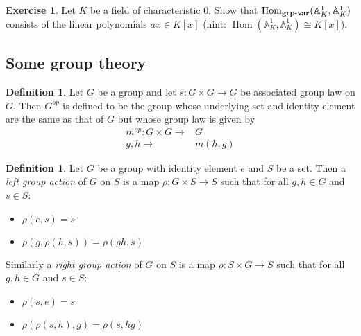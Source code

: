 \documentclass[a4paper,12pt,reqno]{amsart}
\newcommand{\field}[1]{\mathbb{#1}}  %
\newcommand{\A}{\field{A}}
\newcommand{\HomGrpVar}{\mathrm{Hom}_{\bf grp\text{-}var}}
\DeclareMathOperator{\Hom}{Hom}
\theoremstyle{definition}
\newtheorem{definition}[lemma]{Definition}
\newtheorem{exercise}[lemma]{Exercise}
\numberwithin{lemma}{section}
\numberwithin{equation}{section}
\numberwithin{figure}{section}
\begin{document}
\begin{exercise}
Let $K$ be a field of characteristic $0$. Show that $\HomGrpVar(\A^1_K, \A^1_K)$ consists of the linear polynomials $ax \in K[x]$ (hint: $\Hom(\A^1_K, \A^1_K) \cong K[x]$). 
\end{exercise}



\subsection{Some group theory}

\begin{definition}Let $G$ be a group and let $s: G \times G \to G$ be associated group law on $G$. Then $G^{op}$ is defined to be the group whose underlying set and identity element are the same as that of $G$ but whose group law is given by \begin{align*}
	m^{op}: G \times G \to& G \\
	  g,h \mapsto& m(h,g)
	\end{align*}
\end{definition}

\begin{definition}\label{def:group_action}
	Let $G$ be a group with identity element $e$ and $S$ be a set. Then a \textit{left group action} of $G$ on $S$ is a map $\rho: G \times S \to S$  such that for all $g,h \in G$ and $s \in S$:
	\begin{itemize}
		\item $\rho(e, s) = s$
		\item $\rho(g,\rho(h,s))=\rho(gh,s)$
	\end{itemize}
Similarly a \textit{right group action} of $G$ on $S$ is a map $\rho: S \times G \to S$  such that for all $g,h \in G$ and $s \in S$:
\begin{itemize}
	\item $\rho(s,e) = s$
	\item $\rho(\rho(s,h),g)=\rho(s,hg)$
\end{itemize}
\end{definition}
\end{document}

